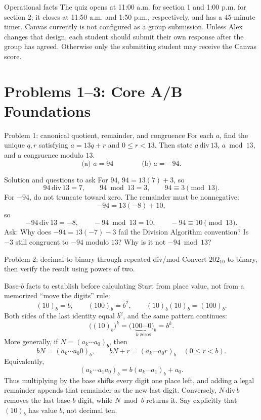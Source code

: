 \documentclass[10pt]{article}
\begin{document}
\begin{warningbox}{Operational facts}
The quiz opens at 11:00 a.m. for section 1 and 1:00 p.m. for section 2; it
closes at 11:50 a.m. and 1:50 p.m., respectively, and has a 45-minute timer.
Canvas currently is not configured as a group submission. Unless Alex changes
that design, each student should submit their own response after the group has
agreed. Otherwise only the submitting student may receive the Canvas score.
\end{warningbox}

\thispagestyle{fancy}
\clearpage
\pagestyle{fancy}
\thispagestyle{fancy}
\section*{Problems 1--3: Core A/B Foundations}
\thispagestyle{fancy}

\begin{promptbox}{Problem 1: canonical quotient, remainder, and congruence}
For each $a$, find the unique $q,r$ satisfying $a=13q+r$ and $0\le r<13$.
Then state $a\,\mathrm{div}\,13$, $a\bmod13$, and a congruence modulo $13$.
\[
\text{(a) }a=94\qquad\qquad\text{(b) }a=-94.
\]
\end{promptbox}

\begin{solutionbox}{Solution and questions to ask}
For $94$, $94=13(7)+3$, so
\[
94\,\mathrm{div}\,13=7,\qquad94\bmod13=3,\qquad94\equiv3\pmod{13}.
\]
For $-94$, do not truncate toward zero. The remainder must be nonnegative:
\[
-94=13(-8)+10,
\]
so
\[
-94\,\mathrm{div}\,13=-8,\qquad-94\bmod13=10,
\qquad-94\equiv10\pmod{13}.
\]
Ask: Why does $-94=13(-7)-3$ fail the Division Algorithm convention? Is
$-3$ still congruent to $-94$ modulo $13$? Why is it not $-94\bmod13$?
\end{solutionbox}

\begin{promptbox}{Problem 2: decimal to binary through repeated div/mod}
Convert $202_{10}$ to binary, then verify the result using powers of two.
\end{promptbox}

\begin{goalbox}{Base-$b$ facts to establish before calculating}
Start from place value, not from a memorized ``move the digits'' rule:
\[
(10)_b=b,\qquad (100)_b=b^2,\qquad
(10)_b(10)_b=(100)_b.
\]
Both sides of the last identity equal $b^2$, and the same pattern continues:
\[
\bigl((10)_b\bigr)^k
  =\bigl(1\underbrace{00\cdots0}_{k\text{ zeros}}\bigr)_b=b^k.
\]
More generally, if $N=(a_k\cdots a_0)_b$, then
\[
bN=(a_k\cdots a_0 0)_b,
\qquad
bN+r=(a_k\cdots a_0 r)_b\quad(0\le r<b).
\]
Equivalently,
\[
(a_k\cdots a_1a_0)_b=b(a_k\cdots a_1)_b+a_0.
\]
Thus multiplying by the base shifts every digit one place left, and adding a
legal remainder appends that remainder as the new last digit. Conversely,
$N\,\mathrm{div}\,b$ removes the last base-$b$ digit, while $N\bmod b$
returns it. Say explicitly that $(10)_b$ has value $b$, not decimal ten.
\end{goalbox}
\end{document}
